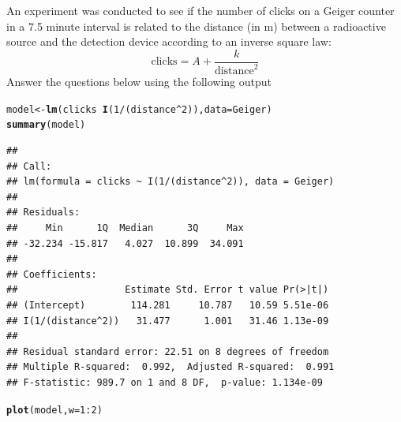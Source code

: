 \documentclass[twoside]{book}
\makeatletter
\newcommand{\hlnum}[1]{\textcolor[rgb]{0.686,0.059,0.569}{#1}}%
\newcommand{\hlopt}[1]{\textcolor[rgb]{0,0,0}{#1}}%
\newcommand{\hlstd}[1]{\textcolor[rgb]{0.345,0.345,0.345}{#1}}%
\newcommand{\hlkwb}[1]{\textcolor[rgb]{0.69,0.353,0.396}{#1}}%
\newcommand{\hlkwc}[1]{\textcolor[rgb]{0.333,0.667,0.333}{#1}}%
\newcommand{\hlkwd}[1]{\textcolor[rgb]{0.737,0.353,0.396}{\textbf{#1}}}%
\newenvironment{kframe}{%
 \def\at@end@of@kframe{}%
 \ifinner\ifhmode%
  \def\at@end@of@kframe{\end{minipage}}%
  \begin{minipage}{\columnwidth}%
 \fi\fi%
 \def\FrameCommand##1{\hskip\@totalleftmargin \hskip-\fboxsep
 \colorbox{shadecolor}{##1}\hskip-\fboxsep
     \hskip-\linewidth \hskip-\@totalleftmargin \hskip\columnwidth}%
 \MakeFramed {\advance\hsize-\width
   \@totalleftmargin\z@ \linewidth\hsize
   \@setminipage}}%
 {\par\unskip\endMakeFramed%
 \at@end@of@kframe}
\newenvironment{knitrout}{}{} %
\makeatother
\begin{document}
\begin{problem}
	An experiment was conducted to see if the number of clicks 
	on a Geiger counter in a 7.5 minute interval is related to
	the distance (in m) between a radioactive source and the detection 
	device according to an inverse square law:
	\[
	\mbox{clicks} =	A + \frac{k}{\mbox{distance}^{2}}
	\]
	Answer the questions below using the following output

\begin{knitrout}
\color{fgcolor}\begin{kframe}
\begin{alltt}
\hlstd{model} \hlkwb{<-} \hlkwd{lm}\hlstd{(clicks} \hlopt{~} \hlkwd{I}\hlstd{(}\hlnum{1}\hlopt{/}\hlstd{(distance}\hlopt{^}\hlnum{2}\hlstd{)),} \hlkwc{data} \hlstd{= Geiger)}
\hlkwd{summary}\hlstd{(model)}
\end{alltt}
\begin{verbatim}
## 
## Call:
## lm(formula = clicks ~ I(1/(distance^2)), data = Geiger)
## 
## Residuals:
##     Min      1Q  Median      3Q     Max 
## -32.234 -15.817   4.027  10.899  34.091 
## 
## Coefficients:
##                   Estimate Std. Error t value Pr(>|t|)
## (Intercept)        114.281     10.787   10.59 5.51e-06
## I(1/(distance^2))   31.477      1.001   31.46 1.13e-09
## 
## Residual standard error: 22.51 on 8 degrees of freedom
## Multiple R-squared:  0.992,	Adjusted R-squared:  0.991 
## F-statistic: 989.7 on 1 and 8 DF,  p-value: 1.134e-09
\end{verbatim}
\begin{alltt}
\hlkwd{plot}\hlstd{(model,} \hlkwc{w} \hlstd{=} \hlnum{1}\hlopt{:}\hlnum{2}\hlstd{)}
\end{alltt}
\end{kframe}


\end{knitrout}
\end{problem}
\end{document}
